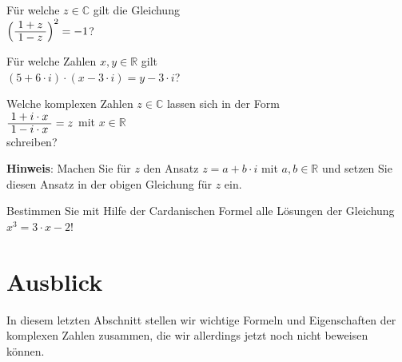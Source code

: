 \exercise
F\"{u}r welche $z \in \mathbb{C}$ gilt die Gleichung
\\[0.2cm]
\hspace*{1.3cm}
$\left(\bruch{1+z}{1-z}\right)^2 = -1$?
\exend
\pagebreak

\exercise
F\"{u}r welche Zahlen $x, y \in \mathbb{R}$ gilt
\\[0.2cm]
\hspace*{1.3cm}
$(5 + 6 \cdot i) \cdot (x - 3 \cdot i) = y - 3 \cdot i$?
\exend

\exercise
Welche komplexen Zahlen $z \in \mathbb{C}$ lassen sich in der Form
\\[0.2cm]
\hspace*{1.3cm}
$\bruch{1 + i \cdot x}{1 - i \cdot x} = z$ \quad mit $x \in \mathbb{R}$
\\[0.2cm]
schreiben? 
\vspace*{0.2cm}

\noindent
\textbf{Hinweis}:  Machen Sie f\"{u}r $z$ den Ansatz $z = a + b \cdot i$ mit $a,b \in \mathbb{R}$ und
setzen Sie diesen Ansatz in der obigen Gleichung f\"{u}r $z$ ein.  
\exend

\exercise
Bestimmen Sie mit Hilfe der Cardanischen Formel alle L\"{o}sungen der Gleichung 
\\[0.2cm]
\hspace*{1.3cm}
$x^3 = 3 \cdot x - 2$!
\exend


\section{Ausblick}
In diesem letzten Abschnitt stellen wir wichtige Formeln und Eigenschaften der komplexen Zahlen
zusammen, die wir allerdings jetzt noch nicht beweisen k\"{o}nnen.

